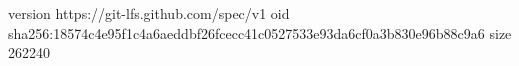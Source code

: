 version https://git-lfs.github.com/spec/v1
oid sha256:18574c4e95f1c4a6aeddbf26fcecc41c0527533e93da6cf0a3b830e96b88c9a6
size 262240
